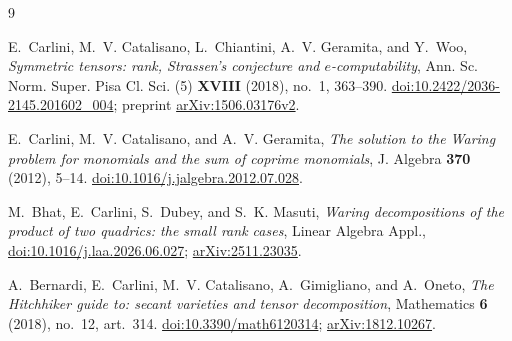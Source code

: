 \documentclass[11pt]{amsart}
\theoremstyle{remark}
\theoremstyle{definition}
\begin{document}
\begin{thebibliography}{9}

E.~Carlini, M.~V. Catalisano, L.~Chiantini, A.~V. Geramita, and Y.~Woo,
\emph{Symmetric tensors: rank, Strassen's conjecture and $e$-computability},
Ann. Sc. Norm. Super. Pisa Cl. Sci. (5) \textbf{XVIII} (2018), no.~1, 363--390.
\href{https://doi.org/10.2422/2036-2145.201602_004}{doi:10.2422/2036-2145.201602\_004};
preprint \href{https://arxiv.org/abs/1506.03176}{arXiv:1506.03176v2}.

E.~Carlini, M.~V. Catalisano, and A.~V. Geramita,
\emph{The solution to the Waring problem for monomials and the sum of coprime monomials},
J. Algebra \textbf{370} (2012), 5--14.
\href{https://doi.org/10.1016/j.jalgebra.2012.07.028}{doi:10.1016/j.jalgebra.2012.07.028}.

M.~Bhat, E.~Carlini, S.~Dubey, and S.~K. Masuti,
\emph{Waring decompositions of the product of two quadrics: the small rank cases},
Linear Algebra Appl.,
\href{https://doi.org/10.1016/j.laa.2026.06.027}{doi:10.1016/j.laa.2026.06.027};
\href{https://arxiv.org/abs/2511.23035}{arXiv:2511.23035}.

A.~Bernardi, E.~Carlini, M.~V. Catalisano, A.~Gimigliano, and A.~Oneto,
\emph{The Hitchhiker guide to: secant varieties and tensor decomposition},
Mathematics \textbf{6} (2018), no.~12, art.~314.
\href{https://doi.org/10.3390/math6120314}{doi:10.3390/math6120314};
\href{https://arxiv.org/abs/1812.10267}{arXiv:1812.10267}.

\end{thebibliography}
\end{document}
